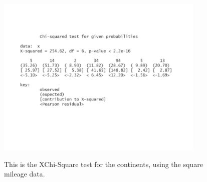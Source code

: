 \documentclass[12pt, letterpaper]{article}
\begin{document}
\begin{figure}[h]
\begin{center}
\includegraphics[width=10cm]{ContinentChiSquare2.pdf}
\label{fig: Continent XChi-Square with Square Mileage}
\caption{This is the XChi-Square test for the continents, using the square mileage data.}
\end{center}
\end{figure}
\end{document}
